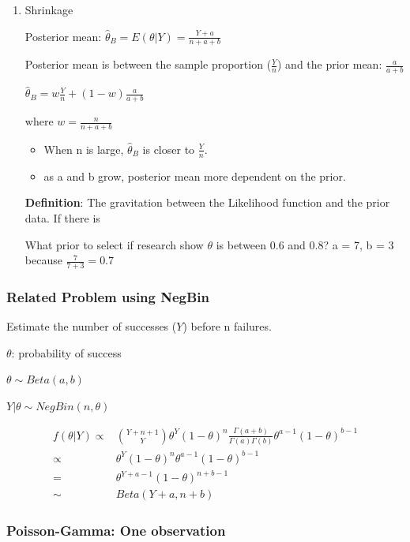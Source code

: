 \documentclass[11pt]{article}
\begin{document}
\begin{enumerate}
\item Shrinkage
\label{sec:orgdd60158}


Posterior mean: \(\hat \theta_B = E(\theta | Y) = \frac{Y + a}{n + a + b}\)

Posterior mean is between the sample proportion (\(\frac{Y}{n}\)) and the prior
mean: \(\frac{a}{a + b}\)

\(\hat \theta_B = w \frac{Y}{n} + (1 - w) \frac{a}{a + b}\)

where \(w = \frac{n}{n + a + b}\)

\begin{itemize}
\item When n is large, \(\hat \theta_B\) is closer to \(\frac{Y}{n}\).
\item as a and b grow, posterior mean more dependent on the prior.
\end{itemize}

\textbf{Definition}: The gravitation between the Likelihood function and the prior
data. If there is

What prior to select if research show \(\theta\) is between 0.6 and 0.8? a = 7, b
= 3 because \(\frac{7}{7 + 3} = 0.7\)
\end{enumerate}

\subsubsection{Related Problem using NegBin}
\label{sec:org6679c56}

Estimate the number of successes (\(Y\)) before n failures.

\(\theta\): probability of success

\(\theta \sim Beta(a, b)\)

\(Y | \theta \sim NegBin(n, \theta)\)

\begin{equation}
\begin{split}
f(\theta  | Y) \propto & {Y + n + 1 \choose Y} \theta^Y (1 - \theta)^{n} \frac{\Gamma (a + b)}{\Gamma (a) \Gamma (b)} \theta^{a - 1} (1 - \theta)^{b - 1}\\
\propto & \theta^Y (1 - \theta)^{n} \theta^{a - 1} (1 - \theta)^{b - 1}\\
= & \theta^{Y + a - 1} (1 - \theta)^{n + b - 1}\\
\sim & Beta(Y + a, n + b)
\end{split}
\end{equation}

\subsubsection{Poisson-Gamma: One observation}
\label{sec:org95cf94f}
\end{document}
